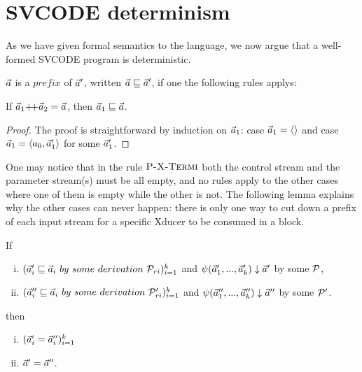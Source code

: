 %
%



\section{SVCODE determinism}

As we have given formal semantics to the language, we now argue that a well-formed SVCODE program is deterministic.

 
\begin{defi}
	$\vec a$ is a $prefix$ of $\vec a'$, written $\vec a \sqsubseteq \vec a'$, if one the following rules applys: \\
	
	\emph{}
	
\end{defi}

\begin{lem}\label{lem-app2pre}
	If $\a_1 {\++} \a_2 = \a$, then $\vec a_1 \sqsubseteq \vec a$.
\end{lem}
\begin{proof}
	The proof is straightforward by induction on $\vec a_1$: case $\vec a_1 = \langle \rangle$ and case $ \a_1 = \< a_0, \a_1' \'>$ for some $\vec a_1'$.
\end{proof}

One may notice that in the rule $\textsc{P-X-Termi}$ both the control stream and the parameter stream(s) must be all empty, and no rules apply to the other cases where one of them is empty while the other is not. The following lemma explains why the other cases can never happen: 
there is only one way to cut down a prefix of each input stream for
a specific Xducer to be consumed in a block.


\begin{lem} \label{lem-block-unique}
	If
	\begin{enumerate}[(i)]
		\item $(\a_i' \prefix  \a_i \ by \ some \ derivation \ \MP_{ri})^k_{i=1}$ and ${\psi}(\vec a_1',...,\vec a_k') \downarrow \vec a'$ by some $\mathcal{P}$, 
		\item $(\a_i'' \prefix \a_i \ by \ some \ derivation \ \MP'_{ri})^k_{i=1}$ and
		${\psi}(\vec a_1'',...,\vec a_k'') \downarrow \vec a''$ by some $\mathcal{P}'$.
	\end{enumerate} 
	then \begin{enumerate}[(i)]
		\item $(\vec a_i' = \vec a_i'')^k_{i=1}$ 
		\item $\vec a' = \vec a''$.
	\end{enumerate}
\end{lem}

